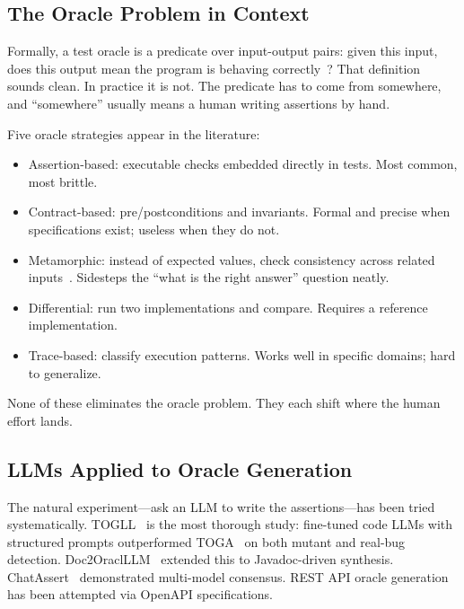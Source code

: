 \documentclass[conference]{IEEEtran}
\begin{document}
\subsection{The Oracle Problem in Context}

Formally, a test oracle is a predicate over input-output pairs: given this input, does this output mean the program is behaving correctly~\cite{barr2015oracle,pezze2014automated}? That definition sounds clean. In practice it is not. The predicate has to come from somewhere, and ``somewhere'' usually means a human writing assertions by hand.

Five oracle strategies appear in the literature:

\begin{itemize}
\item Assertion-based: executable checks embedded directly in tests. Most common, most brittle.
\item Contract-based: pre/postconditions and invariants. Formal and precise when specifications exist; useless when they do not.
\item Metamorphic: instead of expected values, check consistency across related inputs~\cite{segura2016metamorphic,chen2018metamorphic}. Sidesteps the ``what is the right answer'' question neatly.
\item Differential: run two implementations and compare. Requires a reference implementation.
\item Trace-based: classify execution patterns. Works well in specific domains; hard to generalize.
\end{itemize}

None of these eliminates the oracle problem. They each shift where the human effort lands.

\subsection{LLMs Applied to Oracle Generation}

The natural experiment—ask an LLM to write the assertions—has been tried systematically. TOGLL~\cite{hossain2024togll} is the most thorough study: fine-tuned code LLMs with structured prompts outperformed TOGA~\cite{dinella2022toga} on both mutant and real-bug detection. Doc2OraclLLM~\cite{hossain2025doc2oracll} extended this to Javadoc-driven synthesis. ChatAssert~\cite{hayet2024chatassert} demonstrated multi-model consensus. REST API oracle generation has been attempted via OpenAPI specifications.
\end{document}
